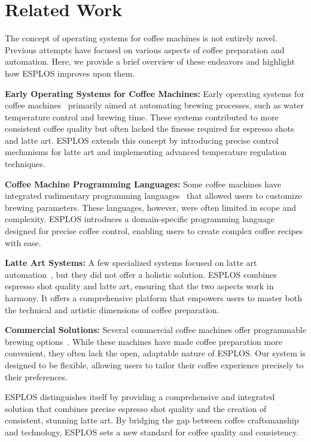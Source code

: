 \documentclass[nonacm,sigplan]{acmart}
\begin{document}
\section{Related Work}
The concept of operating systems for coffee machines is not entirely novel. Previous attempts have focused on various aspects of coffee preparation and automation. Here, we provide a brief overview of these endeavors and highlight how ESPLOS improves upon them.

\textbf{Early Operating Systems for Coffee Machines:} Early operating systems for coffee machines~\cite{first_reference} primarily aimed at automating brewing processes, such as water temperature control and brewing time. These systems contributed to more consistent coffee quality but often lacked the finesse required for espresso shots and latte art. ESPLOS extends this concept by introducing precise control mechanisms for latte art and implementing advanced temperature regulation techniques.

\textbf{Coffee Machine Programming Languages:} Some coffee machines have integrated rudimentary programming languages~\cite{second_reference} that allowed users to customize brewing parameters. These languages, however, were often limited in scope and complexity. ESPLOS introduces a domain-specific programming language designed for precise coffee control, enabling users to create complex coffee recipes with ease.

\textbf{Latte Art Systems:} A few specialized systems focused on latte art automation~\cite{third_reference}, but they did not offer a holistic solution. ESPLOS combines espresso shot quality and latte art, ensuring that the two aspects work in harmony. It offers a comprehensive platform that empowers users to master both the technical and artistic dimensions of coffee preparation.

\textbf{Commercial Solutions:} Several commercial coffee machines offer programmable brewing options~\cite{fourth_reference}. While these machines have made coffee preparation more convenient, they often lack the open, adaptable nature of ESPLOS. Our system is designed to be flexible, allowing users to tailor their coffee experience precisely to their preferences.

ESPLOS distinguishes itself by providing a comprehensive and integrated solution that combines precise espresso shot quality and the creation of consistent, stunning latte art. By bridging the gap between coffee craftsmanship and technology, ESPLOS sets a new standard for coffee quality and consistency.
\end{document}
